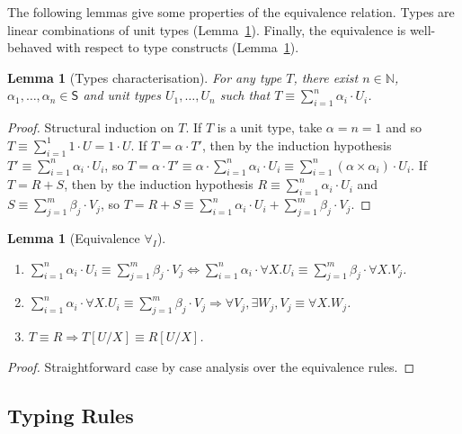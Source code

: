 \documentclass[colorlinks=true,linkcolor=black,urlcolor=black,citecolor=blue,submission,copyright,creativecommons]{eptcs}
\newtheorem{lemma}[theorem]{Lemma}
\newcommand{\Sc}{\mathsf{S}}
\newcommand{\sui}[1]{\sum_{i=1}^{#1}}
\newcommand{\suj}[1]{\sum_{j=1}^{#1}}
\begin{document}
The following lemmas give some properties of the equivalence
relation. Types are linear combinations of unit types
(Lemma~\ref{lem:typecharact}). Finally, the equivalence is well-behaved with respect to
type constructs (Lemma~\ref{lem:equivforall}).

\begin{lemma}[Types characterisation]\label{lem:typecharact}
 For any type $T$, there exist $n\in\mathbb{N}$, $\alpha_1,\dots,\alpha_n\in\Sc$ and unit types $U_1,\dots,U_n$ such that $T\equiv\sui{n}\alpha_i\cdot U_i$.
\end{lemma}
\begin{proof}
 Structural induction on $T$. If $T$ is a unit type, take $\alpha=n=1$ and so $T\equiv\sui{1}1\cdot U=1\cdot U$. If $T=\alpha\cdot T'$, then by the induction hypothesis $T'\equiv\sui{n}\alpha_i\cdot U_i$, so $T=\alpha\cdot T'\equiv\alpha\cdot \sui{n}\alpha_i\cdot U_i\equiv\sui{n}(\alpha\times\alpha_i)\cdot U_i$. If $T=R+S$, then by the induction hypothesis $R\equiv\sui{n}\alpha_i\cdot U_i$ and $S\equiv\suj{m}\beta_j\cdot V_j$, so $T=R+S\equiv\sui{n}\alpha_i\cdot U_i+\suj{m}\beta_j\cdot V_j$.
\end{proof}


\begin{lemma}[Equivalence $\forall_I$]\label{lem:equivforall}~
\begin{enumerate}
 \item\label{it:equivforall1} 
$\sui{n}\alpha_i\cdot U_i\equiv\suj{m}\beta_j\cdot V_j\Leftrightarrow\sui{n}\alpha_i\cdot \forall X.U_i\equiv\suj{m}\beta_j\cdot \forall X.V_j$.
 \item\label{it:equivforall2} $\sui{n}\alpha_i\cdot \forall
   X.U_i\equiv\suj{m}\beta_j\cdot V_j\Rightarrow\forall V_j,\exists W_j, V_j\equiv\forall X.W_j$.
 \item\label{it:equivforall3} $T\equiv R\Rightarrow T[U/X]\equiv R[U/X]$.
\end{enumerate}
\end{lemma}
\begin{proof}
 Straightforward case by case analysis over the equivalence rules.
\end{proof}


\subsection{Typing Rules}
\end{document}
